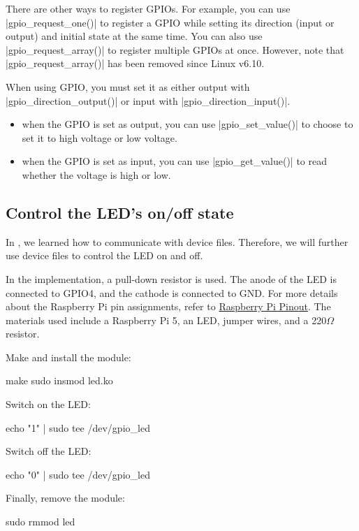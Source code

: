 \documentclass[10pt, oneside]{book}
\begin{document}
There are other ways to register GPIOs.
For example, you can use \cpp|gpio_request_one()| to register a GPIO while setting its direction (input or output) and initial state at the same time.
You can also use \cpp|gpio_request_array()| to register multiple GPIOs at once. However, note that \cpp|gpio_request_array()| has been removed since Linux v6.10.

When using GPIO, you must set it as either output with \cpp|gpio_direction_output()| or input with \cpp|gpio_direction_input()|.

\begin{itemize}
  \item when the GPIO is set as output, you can use \cpp|gpio_set_value()| to choose to set it to high voltage or low voltage.
  \item when the GPIO is set as input, you can use \cpp|gpio_get_value()| to read whether the voltage is high or low.
\end{itemize}

\subsection{Control the LED's on/off state}
\label{sec:gpio_led}
In , we learned how to communicate with device files.
Therefore, we will further use device files to control the LED on and off.

In the implementation, a pull-down resistor is used.
The anode of the LED is connected to GPIO4, and the cathode is connected to GND.
For more details about the Raspberry Pi pin assignments, refer to \href{https://pinout.xyz/}{Raspberry Pi Pinout}.
The materials used include a Raspberry Pi 5, an LED, jumper wires, and a 220$\Omega$ resistor.


Make and install the module:
\begin{codebash}
make
sudo insmod led.ko
\end{codebash}

Switch on the LED:
\begin{codebash}
echo "1" | sudo tee /dev/gpio_led
\end{codebash}

Switch off the LED:
\begin{codebash}
echo "0" | sudo tee /dev/gpio_led
\end{codebash}

Finally, remove the module:
\begin{codebash}
sudo rmmod led
\end{codebash}
\end{document}
